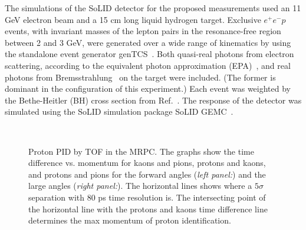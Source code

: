 The simulations of the SoLID detector for the proposed measurements used an 11
GeV electron beam and a 15 cm long liquid hydrogen target. Exclusive
$e^+e^-p$ events, with invariant masses of the lepton pairs in the
resonance-free region between 2 and 3 GeV, were generated over a wide range of
kinematics by using the standalone event generator genTCS~\cite{genTCS}. Both
quasi-real photons from electron scattering, according to the equivalent
photon approximation (EPA)~\cite{Kessler:1994}, and real photons from
Bremsstrahlung~\cite{PDG:2012} on the target were included. (The former is
dominant in the configuration of this experiment.) Each event was weighted by
the Bethe-Heitler (BH) cross section from Ref.~\cite{Berger:2001xd}. The
response of the detector was simulated using the SoLID simulation package
SoLID GEMC~\cite{SoLID_GEMC}.

\begin{figure}[t]
\begin{center}
\mbox{ \quad
{} }
\end{center}
\caption{\small{Proton PID by TOF in the MRPC. The graphs show the time
difference vs. momentum for kaons and pions, protons and kaons, and protons
and pions for the forward angles ({\it left panel:}) and the large angles
({\it right panel:}). The horizontal lines shows where a $5\sigma$ separation
with 80 ps time resolution is. The intersecting point of the horizontal line
with the protons and kaons time difference line determines the max momentum
of proton identification.}}
\label{fig:hid}
\end{figure}

